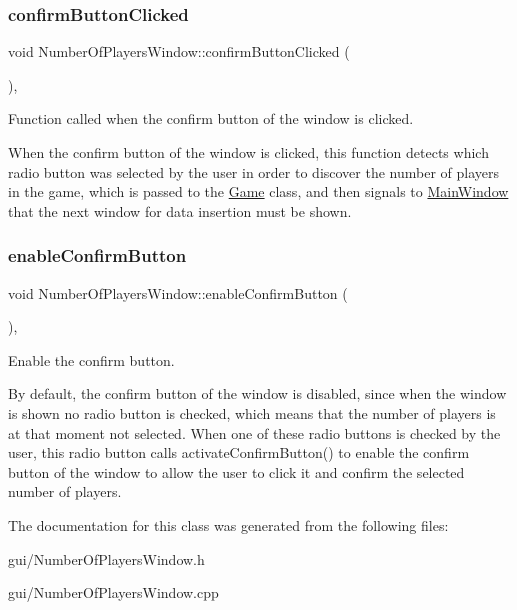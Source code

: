 \subsubsection{\texorpdfstring{confirm\+Button\+Clicked}{confirmButtonClicked}}
{\footnotesize\ttfamily void Number\+Of\+Players\+Window\+::confirm\+Button\+Clicked (\begin{DoxyParamCaption}{ }\end{DoxyParamCaption})\hspace{0.3cm}{\ttfamily [private]}, {\ttfamily [slot]}}



Function called when the confirm button of the window is clicked. 

When the confirm button of the window is clicked, this function detects which radio button was selected by the user in order to discover the number of players in the game, which is passed to the \hyperlink{classGame}{Game} class, and then signals to \hyperlink{classMainWindow}{Main\+Window} that the next window for data insertion must be shown. \mbox{\label{classNumberOfPlayersWindow_a7fe10b716af29b5cca42267a391587ec}} 
\subsubsection{\texorpdfstring{enable\+Confirm\+Button}{enableConfirmButton}}
{\footnotesize\ttfamily void Number\+Of\+Players\+Window\+::enable\+Confirm\+Button (\begin{DoxyParamCaption}{ }\end{DoxyParamCaption})\hspace{0.3cm}{\ttfamily [private]}, {\ttfamily [slot]}}



Enable the confirm button. 

By default, the confirm button of the window is disabled, since when the window is shown no radio button is checked, which means that the number of players is at that moment not selected. When one of these radio buttons is checked by the user, this radio button calls activate\+Confirm\+Button() to enable the confirm button of the window to allow the user to click it and confirm the selected number of players. 

The documentation for this class was generated from the following files\+:\begin{DoxyCompactItemize}
\item 
gui/Number\+Of\+Players\+Window.\+h\item 
gui/Number\+Of\+Players\+Window.\+cpp\end{DoxyCompactItemize}
